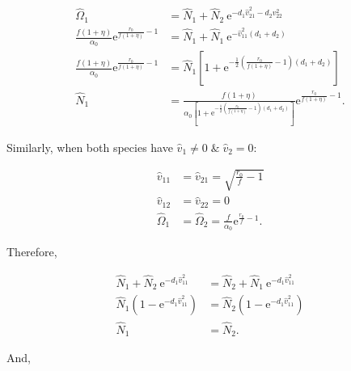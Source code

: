 \begin{equation} \label{eq:two-traits-v1-v2-equal-N}
\begin{split}
    \hat\Omega_1 &= \hat{N}_1 + \hat{N}_2 \: \text{e}^{-d_1 \hat{v}_{21}^2 -
        d_2 v_{22}^2} \\
    \frac{f (1 + \eta)}{\alpha_0} \text{e}^{\frac{r_0}{f (1 + \eta)} - 1} &=
        \hat{N}_1 + \hat{N}_1 \: \text{e}^{- \hat{v}_{11}^2 (d_1 + d_2)} \\
    \frac{f (1 + \eta)}{\alpha_0} \text{e}^{\frac{r_0}{f (1 + \eta)} - 1} &=
        \hat{N}_1 \left[ 1 + \text{e}^{- \frac{1}{2} \left(
            \frac{r_0}{f (1 + \eta)} - 1 \right) (d_1 + d_2)} \right] \\
    \hat{N}_1 &= \frac{f (1 + \eta)}{\alpha_0  \left[ 1 + \text{e}^{- \frac{1}{2} \left(
        \frac{r_0}{f (1 + \eta)} - 1 \right) (d_1 + d_2)} \right] }
        \text{e}^{\frac{r_0}{f (1 + \eta)} - 1}
    \text{.}
\end{split}
\end{equation}




Similarly, when both species have $\hat{v}_1 \ne 0 \; \& \; \hat{v}_2 = 0$:

\begin{equation*}
\begin{split}
    \hat{v}_{11} &= \hat{v}_{21} = \sqrt{ \frac{ r_0 }{ f } - 1 } \\
    \hat{v}_{12} &= \hat{v}_{22} = 0 \\
    \hat\Omega_1 &= \hat\Omega_2 = \frac{f}{\alpha_0} \textrm{e}^{\frac{r_0}{f} - 1}
    \text{.}
\end{split}
\end{equation*}

\noindent Therefore,

\begin{equation} \label{eq:two-traits-v1-nonzero-v2-zero-N1-N2}
\begin{split}
    \hat{N}_1 + \hat{N}_2 \: \text{e}^{- d_1 \hat{v}_{11}^2 } &=
        \hat{N}_2 + \hat{N}_1 \: \text{e}^{- d_1 \hat{v}_{11}^2 } \\
    \hat{N}_1 \left( 1 - \text{e}^{- d_1 \hat{v}_{11}^2 } \right) &=
        \hat{N}_2 \left( 1 - \text{e}^{- d_1 \hat{v}_{11}^2 } \right) \\
    \hat{N}_1 &= \hat{N}_2
    \text{.}
\end{split}
\end{equation}

\noindent And,

